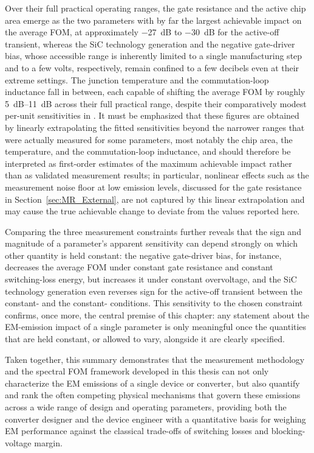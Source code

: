 Over their full practical operating ranges, the gate resistance and the active chip area emerge as the two parameters with by far the largest achievable impact on the average FOM, at approximately \SI{-27}{dB} to \SI{-30}{dB} for the active-off transient, whereas the SiC technology generation and the negative gate-driver bias, whose accessible range is inherently limited to a single manufacturing step and to a few volts, respectively, remain confined to a few decibels even at their extreme settings.
The junction temperature and the commutation-loop inductance fall in between, each capable of shifting the average FOM by roughly \SIrange{5}{11}{dB} across their full practical range, despite their comparatively modest per-unit sensitivities in .
It must be emphasized that these figures are obtained by linearly extrapolating the fitted sensitivities beyond the narrower ranges that were actually measured for some parameters, most notably the chip area, the temperature, and the commutation-loop inductance, and should therefore be interpreted as first-order estimates of the maximum achievable impact rather than as validated measurement results; in particular, nonlinear effects such as the measurement noise floor at low emission levels, discussed for the gate resistance in Section~\ref{sec:MR_External}, are not captured by this linear extrapolation and may cause the true achievable change to deviate from the values reported here.

Comparing the three measurement constraints further reveals that the sign and magnitude of a parameter's apparent sensitivity can depend strongly on which other quantity is held constant: the negative gate-driver bias, for instance, decreases the average FOM under constant gate resistance and constant switching-loss energy, but increases it under constant overvoltage, and the SiC technology generation even reverses sign for the active-off transient between the constant- and the constant- conditions.
This sensitivity to the chosen constraint confirms, once more, the central premise of this chapter: any statement about the EM-emission impact of a single parameter is only meaningful once the quantities that are held constant, or allowed to vary, alongside it are clearly specified.

Taken together, this summary demonstrates that the measurement methodology and the spectral FOM framework developed in this thesis can not only characterize the EM emissions of a single device or converter, but also quantify and rank the often competing physical mechanisms that govern these emissions across a wide range of design and operating parameters, providing both the converter designer and the device engineer with a quantitative basis for weighing EM performance against the classical trade-offs of switching losses and blocking-voltage margin.

